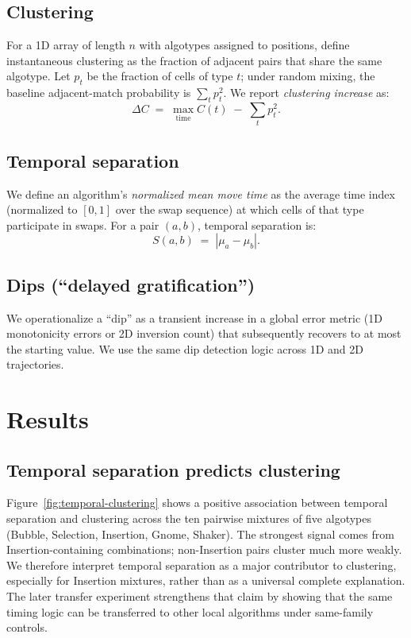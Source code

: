 \documentclass[11pt]{article}
\begin{document}
\subsection{Clustering}
For a 1D array of length $n$ with algotypes assigned to positions, define instantaneous clustering
as the fraction of adjacent pairs that share the same algotype.
Let $p_t$ be the fraction of cells of type $t$; under random mixing, the baseline adjacent-match
probability is $\sum_t p_t^2$. We report \emph{clustering increase} as:
\[
\Delta C \;=\; \max_{\text{time}} C(t) \;-\; \sum_t p_t^2.
\]

\subsection{Temporal separation}
We define an algorithm's \emph{normalized mean move time} as the average time index (normalized to
$[0,1]$ over the swap sequence) at which cells of that type participate in swaps. For a pair
$(a,b)$, temporal separation is:
\[
S(a,b) \;=\; \left|\mu_a - \mu_b\right|.
\]

\subsection{Dips (``delayed gratification'')}
We operationalize a ``dip'' as a transient increase in a global error metric (1D monotonicity errors
or 2D inversion count) that subsequently recovers to at most the starting value. We use the same dip
detection logic across 1D and 2D trajectories.

\section{Results}
\label{sec:results}

\subsection{Temporal separation predicts clustering}
Figure~\ref{fig:temporal-clustering} shows a positive association between temporal separation and
clustering across the ten pairwise mixtures of five algotypes (Bubble, Selection, Insertion,
Gnome, Shaker). The strongest signal comes from Insertion-containing combinations; non-Insertion
pairs cluster much more weakly. We therefore interpret temporal separation as a major contributor to
clustering, especially for Insertion mixtures, rather than as a universal complete explanation.
The later transfer experiment strengthens that claim by showing that the same timing logic can be transferred to
other local algorithms under same-family controls.
\end{document}
